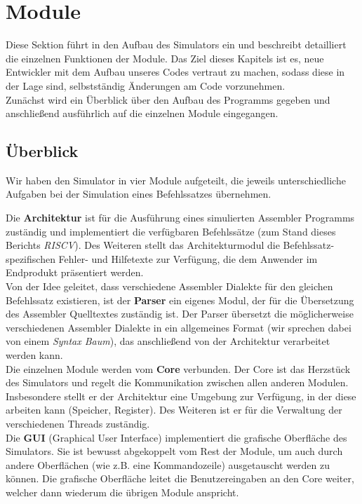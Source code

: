
\section{Module}
\label{dev:modules}

Diese Sektion führt in den Aufbau des Simulators ein und beschreibt detailliert
die einzelnen Funktionen der Module. Das Ziel dieses Kapitels ist es, neue
Entwickler mit dem Aufbau unseres Codes vertraut zu machen, sodass diese in der
Lage sind, selbstständig Änderungen am Code vorzunehmen. \\
Zunächst wird ein Überblick über den Aufbau des Programms gegeben und
anschließend ausführlich auf die einzelnen Module eingegangen.

\subsection{Überblick}

Wir haben den Simulator in vier Module aufgeteilt, die jeweils unterschiedliche
Aufgaben bei der Simulation eines Befehlssatzes übernehmen.

Die \textbf{Architektur} ist für die Ausführung eines simulierten Assembler
Programms zuständig und implementiert die verfügbaren Befehlssätze (zum Stand
dieses Berichts \emph{RISCV}). Des Weiteren stellt das Architekturmodul die
Befehlssatz-spezifischen Fehler- und Hilfetexte zur Verfügung, die dem Anwender
im Endprodukt präsentiert werden. \\ Von der Idee geleitet, dass verschiedene
Assembler Dialekte für den gleichen Befehlssatz existieren, ist der
\textbf{Parser} ein eigenes Modul, der für die Übersetzung des Assembler
Quelltextes zuständig ist. Der Parser übersetzt die möglicherweise verschiedenen
Assembler Dialekte in ein allgemeines Format (wir sprechen dabei von einem
\emph{Syntax Baum}), das anschließend von der Architektur verarbeitet werden
kann. \\
Die einzelnen Module werden vom \textbf{Core} verbunden. Der Core ist das
Herzstück des Simulators und regelt die Kommunikation zwischen allen anderen
Modulen. Insbesondere stellt er der Architektur eine Umgebung zur Verfügung, in
der diese arbeiten kann (Speicher, Register). Des Weiteren ist er für die
Verwaltung der verschiedenen Threads zuständig. \\
Die \textbf{GUI} (Graphical User Interface) implementiert die grafische
Oberfläche des Simulators. Sie ist bewusst abgekoppelt vom Rest der Module,
um auch durch andere Oberflächen (wie z.B. eine Kommandozeile) ausgetauscht
werden zu können. Die grafische Oberfläche leitet die Benutzereingaben an den
Core weiter, welcher dann wiederum die übrigen Module anspricht.








